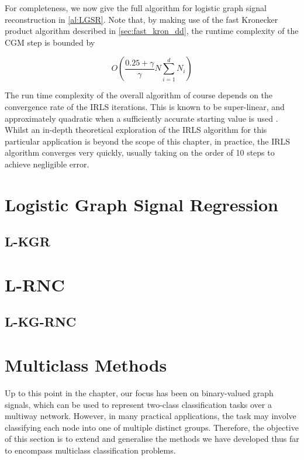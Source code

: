 For completeness, we now give the full algorithm for logistic graph signal reconstruction in \cref{al:LGSR}. Note that, by making use of the fast Kronecker product algorithm described in \cref{sec:fast_kron_dd}, the runtime complexity of the CGM step is bounded by 

\begin{equation*}
    O\left(\frac{0.25 + \gamma}{\gamma} N \sum_{i=1}^d N_i \right)
\end{equation*}

The run time complexity of the overall algorithm of course depends on the convergence rate of the IRLS iterations. This is known to be super-linear, and approximately quadratic when a sufficiently accurate starting value is used \citep{Burden2010}. Whilst an in-depth theoretical exploration of the IRLS algorithm for this particular application is beyond the scope of this chapter, in practice, the IRLS algorithm converges very quickly, usually taking on the order of 10 steps to achieve negligible error.


\section{Logistic Graph Signal Regression} 

 
\label{sec:logistic_regression}

\subsection{L-KGR}

\label{sec:lkgr}

\section{L-RNC}

\label{sec:lrnc}

\subsection{L-KG-RNC}

\label{sec:lkgrnc}

\section{Multiclass Methods}

\label{sec:multiclass}

Up to this point in the chapter, our focus has been on binary-valued graph signals, which can be used to represent two-class classification tasks over a multiway network. However, in many practical applications, the task may involve classifying each node into one of multiple distinct groups. Therefore, the objective of this section is to extend and generalise the methods we have developed thus far to encompass multiclass classification problems.

